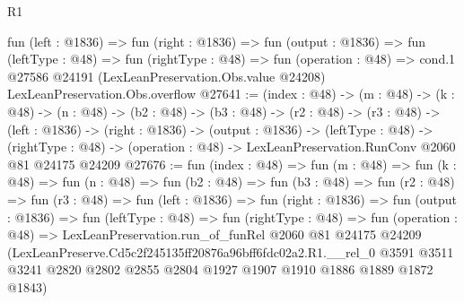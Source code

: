 \begin{lexlean}{R1}
\begin{coremodule}
  fun (left : @1836) =>
  fun (right : @1836) =>
  fun (output : @1836) =>
  fun (leftType : @48) =>
  fun (rightType : @48) =>
  fun (operation : @48) =>
  cond.{1} @27586 @24191 (LexLeanPreservation.Obs.value @24208) LexLeanPreservation.Obs.overflow
@27641 := (index : @48) ->
  (m : @48) ->
  (k : @48) ->
  (n : @48) ->
  (b2 : @48) ->
  (b3 : @48) ->
  (r2 : @48) ->
  (r3 : @48) ->
  (left : @1836) ->
  (right : @1836) ->
  (output : @1836) ->
  (leftType : @48) ->
  (rightType : @48) -> (operation : @48) -> LexLeanPreservation.RunConv @2060 @81 @24175 @24209
@27676 := fun (index : @48) =>
  fun (m : @48) =>
  fun (k : @48) =>
  fun (n : @48) =>
  fun (b2 : @48) =>
  fun (b3 : @48) =>
  fun (r2 : @48) =>
  fun (r3 : @48) =>
  fun (left : @1836) =>
  fun (right : @1836) =>
  fun (output : @1836) =>
  fun (leftType : @48) =>
  fun (rightType : @48) =>
  fun (operation : @48) =>
  LexLeanPreservation.run_of_funRel
    @2060
    @81
    @24175
    @24209
    (LexLeanPreserve.Cd5c2f245135ff20876a96bff6fdc02a2.R1.__rel_0
      @3591
      @3511
      @3241
      @2820
      @2802
      @2855
      @2804
      @1927
      @1907
      @1910
      @1886
      @1889
      @1872
      @1843)
\end{coremodule}
\end{lexlean}
